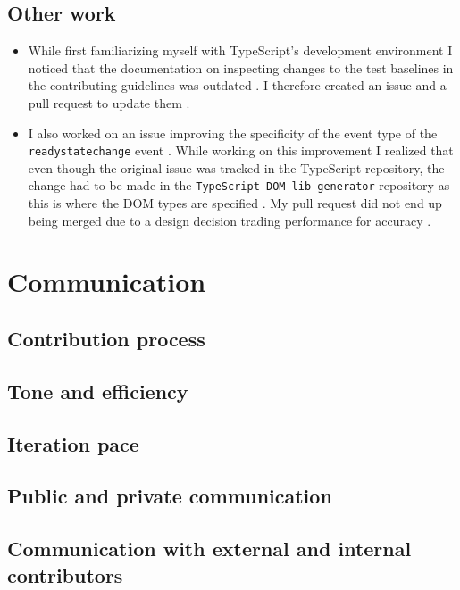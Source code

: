 \documentclass[12pt]{scrartcl}
\def\code#1{\texttt{\frenchspacing#1}}
\let\oldsection\section
\renewcommand\section{\clearpage\oldsection}
\begin{document}
\subsection{Other work}

\begin{itemize}
    \item While first familiarizing myself with TypeScript's development environment I noticed that the documentation on inspecting changes to the test baselines in the contributing guidelines was outdated \cite{ContributingGuidelines}. I therefore created an issue and a pull request to update them \cite{41991}\cite{42031}.
    \item I also worked on an issue improving the specificity of the event type of the \code{readystatechange} event \cite{41775}. While working on this improvement I realized that even though the original issue was tracked in the TypeScript repository, the change had to be made in the \code{TypeScript-DOM-lib-generator} repository as this is where the DOM types are specified \cite{DOMLibGenerator}. My pull request did not end up being merged due to a design decision trading performance for accuracy \cite{969Comment}.
\end{itemize}

\section{Communication}

\subsection{Contribution process}

\subsection{Tone and efficiency}

\subsection{Iteration pace}
\label{iteration_page}

\subsection{Public and private communication}

\subsection{Communication with external and internal contributors}
\end{document}
